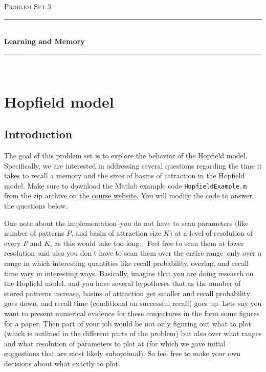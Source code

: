 \documentclass[letterpaper,11pt]{article}
\newcommand{\HRule}{\rule{\linewidth}{0.5mm}}
\begin{document}
\begin{center}
\thispagestyle{empty}

\textsc{\Large Problem Set 3}\\[0.5cm]

\HRule \\[0.6cm]
{ \huge \bfseries Learning and Memory}\\[0.2cm]

\HRule \\[2.5cm]

\end{center}

\section{Hopfield model}
\subsection*{Introduction}
The goal of this problem set is to explore the behavior of the Hopfield model.
Specifically, we are interested in addressing several questions regarding the time it takes to recall a memory and the sizes of basins of attraction in the Hopfield model. 
Make sure to download the Matlab example code \texttt{HopfieldExample.m} from the zip archive on the \href{http://baccuslab.github.io/nepr208}{course website}.
You will modify the code to answer the questions below.

One note about the implementation--you do not have to scan parameters (like number of patterns $P$, and basin of attraction size $K$) at a level of resolution of every $P$ and $K$, as this would take too long.  Feel free to scan them at lower resolution--and also you don't have to scan them over the entire range--only over a range in which interesting quantities like recall probability, overlap, and recall time vary in interesting ways.
Basically, imagine that you are doing research on the Hopfield model, and you have several hypotheses that as the number of stored patterns increase, basins of attraction get smaller and recall probability goes down, and recall time (conditional on successful recall) goes up.
Lets say you want to present numerical evidence for these conjectures in the form some figures for a paper.
Then part of your job would be not only figuring out what to plot (which is outlined in the different parts of the problem) but also over what ranges and what resolution of parameters to plot at (for which we gave initial suggestions that are most likely suboptimal).
So feel free to make your own decisions about what exactly to plot.
\end{document}

